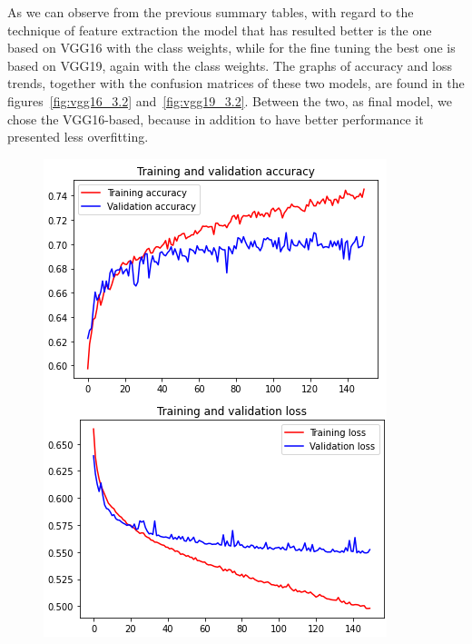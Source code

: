 \documentclass[11pt,a4paper,oneside]{article}
\begin{document}
As we can observe from the previous summary tables, with regard to the technique of feature extraction the model that has resulted better is the one based on VGG16 with the class weights, while for the fine tuning the best one is based on VGG19, again with the class weights. The graphs of accuracy and loss trends, together with the confusion matrices of these two models, are found in the figures~\ref{fig:vgg16_3.2} and~\ref{fig:vgg19_3.2}. Between the two, as final model, we chose the VGG16-based, because in addition to have better performance it presented less overfitting.


\begin{figure}[h]
\centering
	\begin{minipage}[c]{.4\textwidth}
		\centering\setlength{\captionmargin}{0pt}%
		\includegraphics[width=.9\textwidth]{images/Task 3/VGG16 3.2/Accuracy}
	\end{minipage}	
	\hspace{5mm}%
	\begin{minipage}[c]{.4\textwidth}
		\centering\setlength{\captionmargin}{0pt}%

\end{minipage}
\end{figure}
\end{document}
